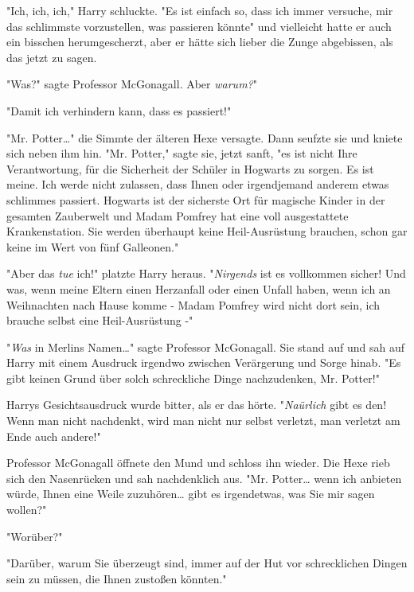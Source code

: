 {"Ich, ich, ich," Harry schluckte. "Es ist einfach so, dass ich immer versuche, mir das schlimmste vorzustellen, was passieren könnte" und vielleicht hatte er auch ein bisschen herumgescherzt, aber er hätte sich lieber die Zunge abgebissen, als das jetzt zu sagen.

"Was?" sagte Professor McGonagall. Aber \emph{warum?}"

"Damit ich verhindern kann, dass es passiert!"

"Mr. Potter…" die Simmte der älteren Hexe versagte. Dann seufzte sie und kniete sich neben ihm hin. "Mr. Potter," sagte sie, jetzt sanft, "es ist nicht Ihre Verantwortung, für die Sicherheit der Schüler in Hogwarts zu sorgen. Es ist meine. Ich werde nicht zulassen, dass Ihnen oder irgendjemand anderem etwas schlimmes passiert. Hogwarts ist der sicherste Ort für magische Kinder in der gesamten Zauberwelt und Madam Pomfrey hat eine voll ausgestattete Krankenstation. Sie werden überhaupt keine Heil-Ausrüstung brauchen, schon gar keine im Wert von fünf Galleonen."

"Aber das \emph{tue} ich!" platzte Harry heraus. "\emph{Nirgends} ist es vollkommen sicher! Und was, wenn meine Eltern einen Herzanfall oder einen Unfall haben, wenn ich an Weihnachten nach Hause komme - Madam Pomfrey wird nicht dort sein, ich brauche selbst eine Heil-Ausrüstung -"

"\emph{Was} in Merlins Namen…" sagte Professor McGonagall. Sie stand auf und sah auf Harry mit einem Ausdruck irgendwo zwischen Verärgerung und Sorge hinab. "Es gibt keinen Grund über solch schreckliche Dinge nachzudenken, Mr. Potter!"

Harrys Gesichtsausdruck wurde bitter, als er das hörte. "\emph{Naürlich} gibt es den! Wenn man nicht nachdenkt, wird man nicht nur selbst verletzt, man verletzt am Ende auch andere!"

Professor McGonagall öffnete den Mund und schloss ihn wieder. Die Hexe rieb sich den Nasenrücken und sah nachdenklich aus. "Mr. Potter… wenn ich anbieten würde, Ihnen eine Weile zuzuhören… gibt es irgendetwas, was Sie mir sagen wollen?"

"Worüber?"

"Darüber, warum Sie überzeugt sind, immer auf der Hut vor schrecklichen Dingen sein zu müssen, die Ihnen zustoßen könnten."

}
